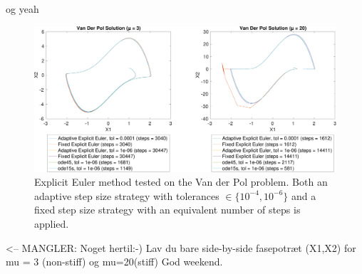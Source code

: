 og yeah 

\begin{figure}[H]
    \centering
    \includegraphics[width=\textwidth]{plots/2_4main_04_06.pdf}
    \caption{Explicit Euler method tested on the Van der Pol problem. Both an adaptive step size strategy with tolerances $\in \{10^{-4}, 10^{-6}\}$ and a fixed step size strategy with an equivalent number of steps is applied.}
    \label{fig:2_4b}
\end{figure}



<-- MANGLER: Noget hertil:-)
Lav du bare side-by-side fasepotræt (X1,X2) for mu = 3 (non-stiff) og mu=20(stiff)
God weekend.